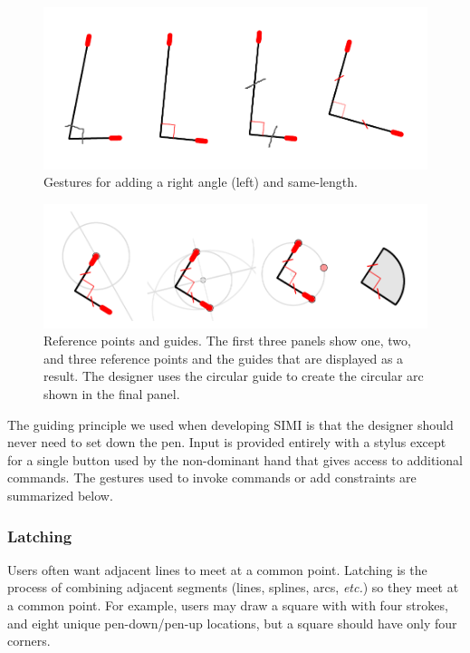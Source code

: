 \documentclass{article}
\begin{document}
\begin{figure}[h]
  \centering
  \includegraphics[width=0.9\linewidth]{img/constraints-all.pdf}
  \caption{Gestures for adding a right angle (left) and same-length.}
  \label{fig:constraints}
\end{figure}

\begin{figure}[h]
  \centering
  \includegraphics[width=0.9\linewidth]{img/guides-all.pdf}
  \caption{Reference points and guides. The first three panels show
    one, two, and three reference points and the guides that are
    displayed as a result. The designer uses the circular guide to
    create the circular arc shown in the final panel.}
  \label{fig:guides}
\end{figure}



The guiding principle we used when developing SIMI is that the
designer should never need to set down the pen. Input is provided
entirely with a stylus except for a single button used by the
non-dominant hand that gives access to additional commands. The
gestures used to invoke commands or add constraints are summarized
below.

\subsubsection{Latching}

Users often want adjacent lines to meet at a common point. Latching is
the process of combining adjacent segments (lines, splines, arcs,
\textit{etc.}) so they meet at a common point. For example, users may
draw a square with with four strokes, and eight unique pen-down/pen-up
locations, but a square should have only four corners.
\end{document}
